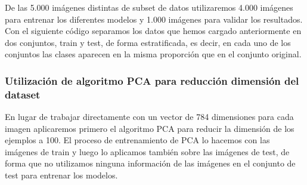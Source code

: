 \documentclass[11pt]{article}
\begin{document}
De las 5.000 imágenes distintas de subset de datos utilizaremos 4.000
imágenes para entrenar los diferentes modelos y 1.000 imágenes para
validar los resultados. Con el siguiente código separamos los datos que
hemos cargado anteriormente en dos conjuntos, train y test, de forma
estratificada, es decir, en cada uno de los conjuntos las clases
aparecen en la misma proporción que en el conjunto original.

\hypertarget{utilizaciuxf3n-de-algoritmo-pca-para-reducciuxf3n-dimensiuxf3n-del-dataset}{%
\subsubsection{Utilización de algoritmo PCA para reducción dimensión del
dataset}\label{utilizaciuxf3n-de-algoritmo-pca-para-reducciuxf3n-dimensiuxf3n-del-dataset}}

En lugar de trabajar directamente con un vector de 784 dimensiones para
cada imagen aplicaremos primero el algoritmo PCA para reducir la
dimensión de los ejemplos a 100. El proceso de entrenamiento de PCA lo
hacemos con las imágenes de train y luego lo aplicamos también sobre las
imágenes de test, de forma que no utilizamos ninguna información de las
imágenes en el conjunto de test para entrenar los modelos.
\end{document}
